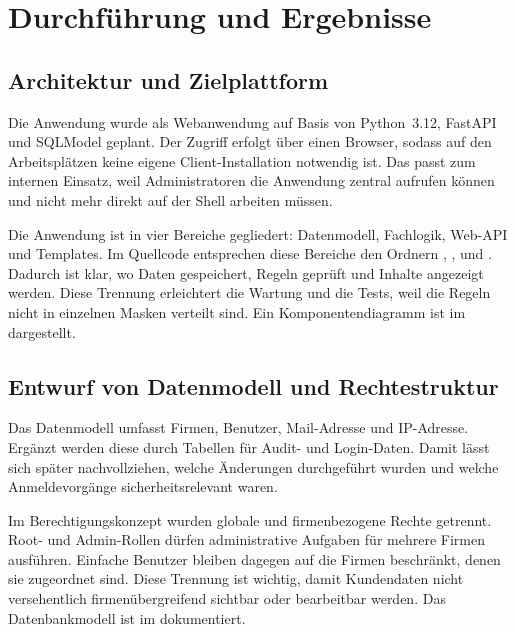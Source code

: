 \section{Durchführung und Ergebnisse}
\label{sec:DurchfuehrungUndErgebnisse}
\subsection{Architektur und Zielplattform}
\label{sec:ArchitekturUndZielplattform}
Die Anwendung wurde als Webanwendung auf Basis von Python~3.12, FastAPI und
SQLModel geplant. Der Zugriff erfolgt über einen Browser, sodass auf den
Arbeitsplätzen keine eigene Client-Installation notwendig ist. Das passt zum
internen Einsatz, weil Administratoren die Anwendung zentral aufrufen können
und nicht mehr direkt auf der Shell arbeiten müssen.

Die Anwendung ist in vier Bereiche gegliedert: Datenmodell, Fachlogik, Web-API
und Templates. Im Quellcode entsprechen diese Bereiche den Ordnern
, ,  und
. Dadurch ist klar, wo Daten gespeichert, Regeln
geprüft und Inhalte angezeigt werden. Diese Trennung erleichtert die Wartung
und die Tests, weil die Regeln nicht in einzelnen Masken verteilt sind.
Ein Komponentendiagramm ist im
 dargestellt.

\subsection{Entwurf von Datenmodell und Rechtestruktur}
\label{sec:DatenmodellUndRechte}
Das Datenmodell umfasst Firmen, Benutzer,
Mail-Adresse und IP-Adresse. Ergänzt werden diese durch Tabellen für Audit- und
Login-Daten. Damit lässt sich später nachvollziehen, welche Änderungen
durchgeführt wurden und welche Anmeldevorgänge sicherheitsrelevant
waren.

Im Berechtigungskonzept wurden globale und firmenbezogene Rechte
getrennt. Root- und Admin-Rollen dürfen administrative Aufgaben für mehrere
Firmen ausführen. Einfache Benutzer bleiben dagegen auf die
Firmen beschränkt, denen sie zugeordnet sind. Diese Trennung ist
wichtig, damit Kundendaten nicht versehentlich firmenübergreifend
sichtbar oder bearbeitbar werden.
Das Datenbankmodell ist im  dokumentiert.

